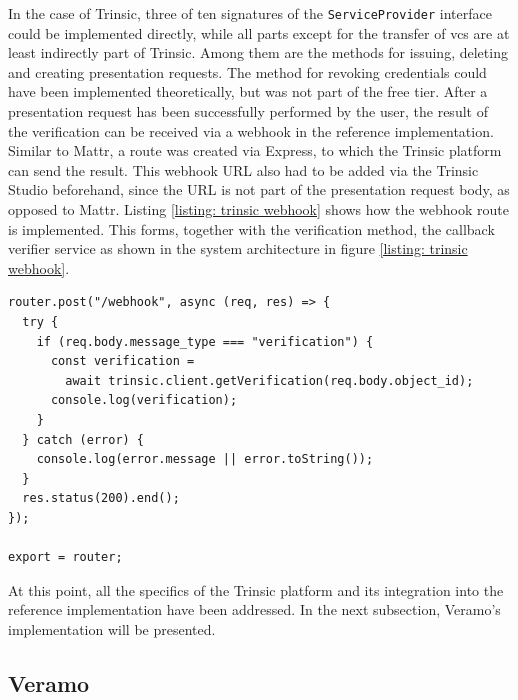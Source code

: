     In the case of Trinsic, three of ten signatures of the \texttt{ServiceProvider} interface could be implemented directly, while all parts except for the transfer of \acp{vc} are at least indirectly part of Trinsic. Among them are the methods for issuing, deleting and creating presentation requests. The method for revoking credentials could have been implemented theoretically, but was not part of the free tier. After a presentation request has been successfully performed by the user, the result of the verification can be received via a webhook in the reference implementation. Similar to Mattr, a route was created via Express, to which the Trinsic platform can send the result. This webhook URL also had to be added via the Trinsic Studio beforehand, since the URL is not part of the presentation request body, as opposed to Mattr. Listing \ref{listing: trinsic webhook} shows how the webhook route is implemented. This forms, together with the verification method, the callback verifier service as shown in the system architecture in figure \ref{listing: trinsic webhook}.
    \newline
    
    \begin{lstlisting}[style=ES6, caption=Trinsic webhook for verification result, label={listing: trinsic webhook}]
router.post("/webhook", async (req, res) => {
  try {
    if (req.body.message_type === "verification") {
      const verification = 
        await trinsic.client.getVerification(req.body.object_id);
      console.log(verification);
    }
  } catch (error) {
    console.log(error.message || error.toString());
  }
  res.status(200).end();
});

export = router;
\end{lstlisting}

        At this point, all the specifics of the Trinsic platform and its integration into the reference implementation have been addressed. In the next subsection, Veramo's implementation will be presented.
    
        \subsection{Veramo}
        
